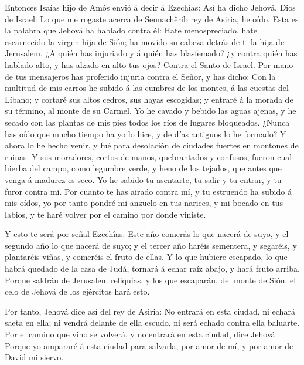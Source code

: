  Entonces Isaías hijo de Amós envió á decir á Ezechîas:
Así ha dicho Jehová, Dios de Israel: Lo que me rogaste acerca de
Sennachêrib rey de Asiria, he oído.  Esta es la palabra
que Jehová ha hablado contra él: Hate menospreciado, hate escarnecido la
virgen hija de Sión; ha movido su cabeza detrás de ti la hija de
Jerusalem.  ¿A quién has injuriado y á quién has
blasfemado? ¿y contra quién has hablado alto, y has alzado en alto tus
ojos? Contra el Santo de Israel.  Por mano de tus
mensajeros has proferido injuria contra el Señor, y has dicho: Con la
multitud de mis carros he subido á las cumbres de los montes, á las
cuestas del Líbano; y cortaré sus altos cedros, sus hayas escogidas; y
entraré á la morada de su término, al monte de su Carmel.
 Yo he cavado y bebido las aguas ajenas, y he secado con
las plantas de mis pies todos los ríos de lugares bloqueados.
 ¿Nunca has oído que mucho tiempo ha yo lo hice, y de
días antiguos lo he formado? Y ahora lo he hecho venir, y fué para
desolación de ciudades fuertes en montones de ruinas.  Y
sus moradores, cortos de manos, quebrantados y confusos, fueron cual
hierba del campo, como legumbre verde, y heno de los tejados, que antes
que venga á madurez es seco.  Yo he sabido tu asentarte,
tu salir y tu entrar, y tu furor contra mí.  Por cuanto
te has airado contra mí, y tu estruendo ha subido á mis oídos, yo por
tanto pondré mi anzuelo en tus narices, y mi bocado en tus labios, y te
haré volver por el camino por donde viniste.

 Y esto te será por señal Ezechîas: Este año comerás lo
que nacerá de suyo, y el segundo año lo que nacerá de suyo; y el tercer
año haréis sementera, y segaréis, y plantaréis viñas, y comeréis el
fruto de ellas.  Y lo que hubiere escapado, lo que habrá
quedado de la casa de Judá, tornará á echar raíz abajo, y hará fruto
arriba.  Porque saldrán de Jerusalem reliquias, y los que
escaparán, del monte de Sión: el celo de Jehová de los ejércitos hará
esto.

 Por tanto, Jehová dice así del rey de Asiria: No entrará
en esta ciudad, ni echará saeta en ella; ni vendrá delante de ella
escudo, ni será echado contra ella baluarte.  Por el
camino que vino se volverá, y no entrará en esta ciudad, dice Jehová.
 Porque yo ampararé á esta ciudad para salvarla, por amor
de mí, y por amor de David mi siervo.

